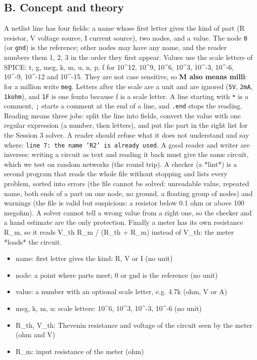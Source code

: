\documentclass[11pt,a4paper]{article}
\begin{document}
\subsection*{B. Concept and theory}
A netlist line has four fields: a name whose first letter gives the kind of part (R resistor, V voltage source, I current source), two nodes, and a value. The node \texttt{0} (or \texttt{gnd}) is the reference; other nodes may have any name, and the reader numbers them 1, 2, 3 in the order they first appear. Values use the scale letters of SPICE: t, g, meg, k, m, u, n, p, f for 10\textasciicircum{}12, 10\textasciicircum{}9, 10\textasciicircum{}6, 10\textasciicircum{}3, 10\textasciicircum{}-3, 10\textasciicircum{}-6, 10\textasciicircum{}-9, 10\textasciicircum{}-12 and 10\textasciicircum{}-15. They are not case sensitive, so \textbf{M also means milli}: for a million write \texttt{meg}. Letters after the scale are a unit and are ignored (\texttt{5V}, \texttt{2mA}, \texttt{1kohm}), and \texttt{1F} is one femto because f is a scale letter. A line starting with \texttt{*} is a comment, \texttt{;} starts a comment at the end of a line, and \texttt{.end} stops the reading. Reading means three jobs: split the line into fields, convert the value with one regular expression (a number, then letters), and put the part in the right list for the Session 3 solver. A reader should refuse what it does not understand and say where: \texttt{line 7: the name 'R2' is already used}. A good reader and writer are inverses: writing a circuit as text and reading it back must give the same circuit, which we test on random networks (the round trip). A checker (a *lint*) is a second program that reads the whole file without stopping and lists every problem, sorted into errors (the file cannot be solved: unreadable value, repeated name, both ends of a part on one node, no ground, a floating group of nodes) and warnings (the file is valid but suspicious: a resistor below 0.1 ohm or above 100 megohm). A solver cannot tell a wrong value from a right one, so the checker and a hand estimate are the only protection. Finally a meter has its own resistance R\_m, so it reads V\_th R\_m / (R\_th + R\_m) instead of V\_th: the meter *loads* the circuit.

\begin{itemize}[nosep]
\item name: first letter gives the kind: R, V or I (no unit)
\item node: a point where parts meet; 0 or gnd is the reference (no unit)
\item value: a number with an optional scale letter, e.g. 4.7k (ohm, V or A)
\item meg, k, m, u: scale letters: 10\textasciicircum{}6, 10\textasciicircum{}3, 10\textasciicircum{}-3, 10\textasciicircum{}-6 (no unit)
\item R\_th, V\_th: Thevenin resistance and voltage of the circuit seen by the meter (ohm and V)
\item R\_m: input resistance of the meter (ohm)
\end{itemize}
\end{document}
